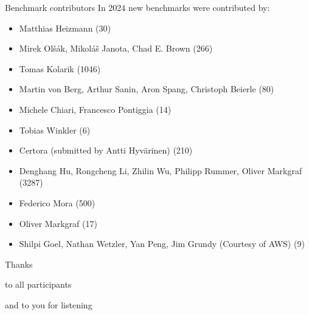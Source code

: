 \documentclass[table]{beamer}
\def\emph#1{\textcolor{MYblue}{#1}}
\begin{document}
\begin{frame}[shrink=0.95]{Benchmark contributors}
  In 2024 \emph{new benchmarks} were contributed by:

  \small
  \begin{itemize}
    \item Matthias Heizmann (30)
    \item Mirek Olšák, Mikoláš Janota, Chad E. Brown (266)
    \item Tomas Kolarik (1046)
    \item Martin von Berg, Arthur Sanin, Aron Spang, Christoph Beierle (80)
    \item Michele Chiari, Francesco Pontiggia (14)
    \item Tobias Winkler (6)
    \item Certora (submitted by Antti Hyvärinen) (210)
    \item Denghang Hu, Rongcheng Li, Zhilin Wu, Philipp Rummer, Oliver Markgraf (3287)
    \item Federico Mora (500)
    \item Oliver Markgraf (17)
    \item Shilpi Goel, Nathan Wetzler, Yan Peng, Jim Grundy (Courtesy of AWS) (9)
  \end{itemize}
\end{frame}

\begin{frame}

  \begin{center}
    \Large\emph{Thanks}
  \end{center}

  \begin{center}
    to all participants
  \end{center}

  \bigskip
  \pause


  \begin{center}
    and to you for listening
  \end{center}

\end{frame}
\end{document}

